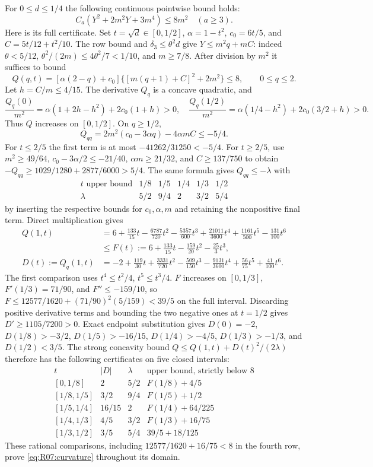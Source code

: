 For $0\le d\le1/4$ the following continuous pointwise bound holds:
\begin{equation}\tag{R07.3.1}\label{eq:R07:curvature}
 C_a(Y^2+2m^2Y+3m^4)\le8m^2\quad(a\ge3).
\end{equation}
Here is its full certificate. Set $t=\sqrt d\in[0,1/2]$,
$\alpha=1-t^2$, $c_0=6t/5$, and $C=5t/12+t^2/10$.
The row bound and $\delta_3\le\theta^2d$ give $Y\le m^2q+mC$:
indeed $\theta<5/12$, $\theta^2/(2m)\le4\theta^2/7<1/10$, and
$m\ge7/8$. After division by $m^2$ it suffices to bound
\[
 Q(q,t)=[\alpha(2-q)+c_0]\{[m(q+1)+C]^2+2m^2\}\le8,
 \qquad0\le q\le2.
\]
Let $h=C/m\le4/15$. The derivative $Q_q$ is a concave quadratic, and
\[
 \frac{Q_q(0)}{m^2}=\alpha(1+2h-h^2)+2c_0(1+h)>0,\quad
 \frac{Q_q(1/2)}{m^2}=\alpha(1/4-h^2)+2c_0(3/2+h)>0.
\]
Thus $Q$ increases on $[0,1/2]$. On $q\ge1/2$,
\[
 Q_{qq}=2m^2(c_0-3\alpha q)-4\alpha mC\le-5/4.
\]
For $t\le2/5$ the first term is at most $-41262/31250<-5/4$.
For $t\ge2/5$, use $m^2\ge49/64$, $c_0-3\alpha/2\le-21/40$,
$\alpha m\ge21/32$, and $C\ge137/750$ to obtain
$-Q_{qq}\ge1029/1280+2877/6000>5/4$.
The same formula gives $Q_{qq}\le-\lambda$ with
\[
\begin{array}{c|ccccc}
 t\text{ upper bound}&1/8&1/5&1/4&1/3&1/2\\\hline
 \lambda&5/2&9/4&2&3/2&5/4
\end{array}
\]
by inserting the respective bounds for $c_0,\alpha,m$ and retaining the
nonpositive final term. Direct multiplication gives
\begin{align*}
 Q(1,t)&=6+\tfrac{133}{15}t-\tfrac{6787}{720}t^2
 -\tfrac{5357}{600}t^3+\tfrac{21011}{3600}t^4
 +\tfrac{1161}{500}t^5-\tfrac{131}{100}t^6\\
 &\le F(t):=6+\tfrac{133}{15}t-\tfrac{159}{20}t^2-\tfrac{25}{3}t^3,\\
 D(t):=Q_q(1,t)&=-2+\tfrac{119}{30}t+\tfrac{3331}{720}t^2
 -\tfrac{509}{150}t^3-\tfrac{9131}{3600}t^4
 +\tfrac{56}{75}t^5+\tfrac{41}{100}t^6.
\end{align*}
The first comparison uses $t^4\le t^2/4$, $t^5\le t^3/4$.
$F$ increases on $[0,1/3]$, $F'(1/3)=71/90$, and
$F''\le-159/10$, so
$F\le12577/1620+(71/90)^2(5/159)<39/5$ on the full interval.
Discarding positive derivative terms and bounding the two negative
ones at $t=1/2$ gives $D'\ge1105/7200>0$.
Exact endpoint substitution gives
$D(0)=-2$, $D(1/8)>-3/2$, $D(1/5)>-16/15$,
$D(1/4)>-4/5$, $D(1/3)>-1/3$, and $D(1/2)<3/5$.
The strong concavity bound $Q\le Q(1,t)+D(t)^2/(2\lambda)$ therefore
has the following certificates on five closed intervals:
\[
\begin{array}{c|c|c|l}
 t&|D|&\lambda&\text{upper bound, strictly below }8\\\hline
 {}[0,1/8]&2&5/2&F(1/8)+4/5\\
 {}[1/8,1/5]&3/2&9/4&F(1/5)+1/2\\
 {}[1/5,1/4]&16/15&2&F(1/4)+64/225\\
 {}[1/4,1/3]&4/5&3/2&F(1/3)+16/75\\
 {}[1/3,1/2]&3/5&5/4&39/5+18/125
\end{array}
\]
These rational comparisons, including $12577/1620+16/75<8$ in the
fourth row, prove \eqref{eq:R07:curvature} throughout its domain.


